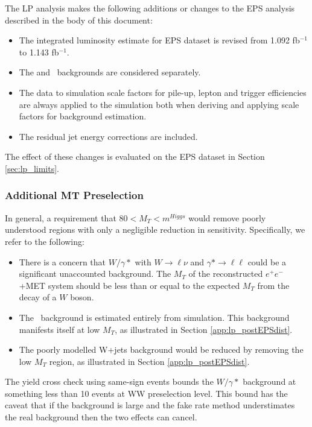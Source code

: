 
The LP analysis makes the following additions or changes to the EPS analysis
described in the body of this document:

\begin{itemize}
    \item The integrated luminosity estimate for EPS dataset is revised from 1.092 fb$^{-1}$ to 1.143 fb$^{-1}$.
    \item The \dytt and \dyll~backgrounds are considered separately.
    \item The data to simulation scale factors for pile-up, lepton and trigger efficiencies are 
always applied to the simulation both when deriving and applying scale factors for background estimation.
    \item The residual jet energy corrections are included.
\end{itemize}

The effect of these changes is evaluated on the EPS dataset in Section \ref{sec:lp_limits}.

\subsubsection{Additional MT Preselection}

In general, a requirement that $80 < M_T < m^{Higgs}$ would remove poorly
understood regions with only a negligible reduction in sensitivity.
Specifically, we refer to the following:

\begin{itemize}
    \item There is a concern that $W/\gamma*$ with $W\rightarrow \ell\nu$
and $\gamma*\rightarrow\ell\ell$ could be a significant unaccounted background.
The $M_T$ of the reconstructed $e^{+}e^{-}$+MET system should be less than
    or equal to the expected $M_T$ from the decay of a $W$ boson.
    \item The \dytt~background is estimated entirely from simulation.  
This background manifests itself at low $M_T$, as illustrated in Section \ref{app:lp_postEPSdist}.
    \item The poorly modelled W+jets background would be reduced by removing the low $M_T$ region,
as illustrated in Section \ref{app:lp_postEPSdist}.
\end{itemize}

The yield cross check using same-sign events bounds the $W/\gamma*$ background 
at something less than 10 events at WW preselection level.  
This bound has the caveat that if the background is large and the 
fake rate method understimates the real background then the two
effects can cancel.

